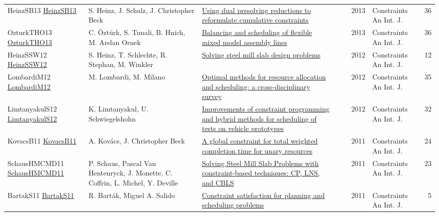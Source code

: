 {\begin{longtable}{p{3cm}p{6cm}p{7cm}rrrp{3cm}r}
HeinzSB13 \href{https://doi.org/10.1007/s10601-012-9136-9}{HeinzSB13} & S. Heinz, J. Schulz, J. Christopher Beck & \href{articles/HeinzSB13.pdf}{Using dual presolving reductions to reformulate cumulative constraints} &  & \cite{HeinzSB13} & 2013 & Constraints An Int. J. & 36\\
OzturkTHO13 \href{https://doi.org/10.1007/s10601-013-9142-6}{OzturkTHO13} & C. {\"{O}}zt{\"{u}}rk, S. Tunali, B. Hnich, M. Arslan Ornek & \href{articles/OzturkTHO13.pdf}{Balancing and scheduling of flexible mixed model assembly lines} &  & \cite{OzturkTHO13} & 2013 & Constraints An Int. J. & 36\\
HeinzSSW12 \href{https://doi.org/10.1007/s10601-011-9113-8}{HeinzSSW12} & S. Heinz, T. Schlechte, R. Stephan, M. Winkler & \href{articles/HeinzSSW12.pdf}{Solving steel mill slab design problems} &  & \cite{HeinzSSW12} & 2012 & Constraints An Int. J. & 12\\
LombardiM12 \href{https://doi.org/10.1007/s10601-011-9115-6}{LombardiM12} & M. Lombardi, M. Milano & \href{articles/LombardiM12.pdf}{Optimal methods for resource allocation and scheduling: a cross-disciplinary survey} &  & \cite{LombardiM12} & 2012 & Constraints An Int. J. & 35\\
LimtanyakulS12 \href{https://doi.org/10.1007/s10601-012-9118-y}{LimtanyakulS12} & K. Limtanyakul, U. Schwiegelshohn & \href{articles/LimtanyakulS12.pdf}{Improvements of constraint programming and hybrid methods for scheduling of tests on vehicle prototypes} &  & \cite{LimtanyakulS12} & 2012 & Constraints An Int. J. & 32\\
KovacsB11 \href{https://doi.org/10.1007/s10601-009-9088-x}{KovacsB11} & A. Kov{\'{a}}cs, J. Christopher Beck & \href{articles/KovacsB11.pdf}{A global constraint for total weighted completion time for unary resources} &  & \cite{KovacsB11} & 2011 & Constraints An Int. J. & 24\\
SchausHMCMD11 \href{https://doi.org/10.1007/s10601-010-9100-5}{SchausHMCMD11} & P. Schaus, Pascal Van Hentenryck, J. Monette, C. Coffrin, L. Michel, Y. Deville & \href{articles/SchausHMCMD11.pdf}{Solving Steel Mill Slab Problems with constraint-based techniques: CP, LNS, and {CBLS}} &  & \cite{SchausHMCMD11} & 2011 & Constraints An Int. J. & 23\\
BartakS11 \href{https://doi.org/10.1007/s10601-011-9109-4}{BartakS11} & R. Bart{\'{a}}k, Miguel A. Salido & \href{articles/BartakS11.pdf}{Constraint satisfaction for planning and scheduling problems} &  & \cite{BartakS11} & 2011 & Constraints An Int. J. & 5\\

\end{longtable}}
